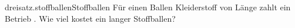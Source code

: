 \begin{exercise}{dreisatz.stoffballen}{Stoffballen}
  \ifproblem\problem
    Für einen Ballen Kleiderstoff von  Länge zahlt ein Betrieb
    . Wie viel kostet ein  langer Stoffballen?
  \fi
\end{exercise}
